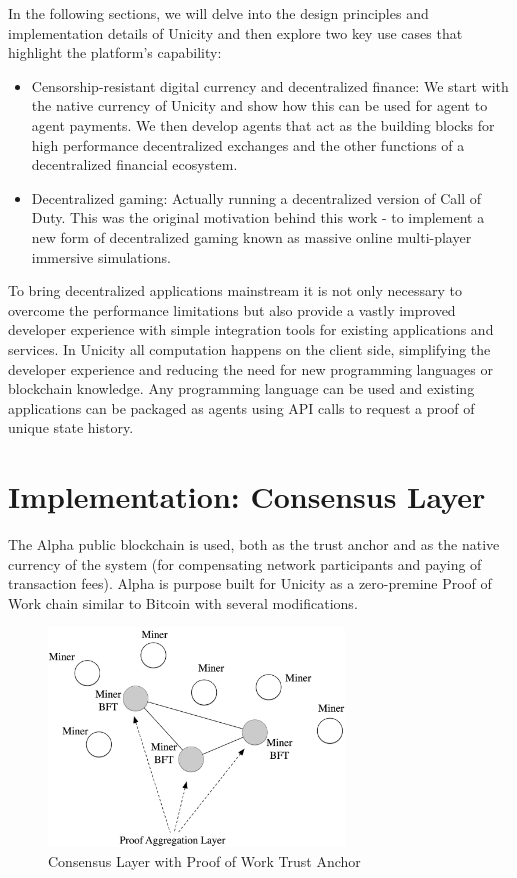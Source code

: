 \documentclass{article}
\begin{document}
\vspace{2mm}

In the following sections, we will delve into the design principles and implementation details of Unicity and then explore two key use cases that highlight the platform's capability:

\begin{itemize}
\setlength{\leftmargin}{1em}
 \item Censorship-resistant digital currency and decentralized finance:  We start with the native currency of Unicity and show how this can be used for agent to agent payments. We then develop agents that act as the building blocks for high performance decentralized exchanges and the other functions of a decentralized financial ecosystem.
 \item Decentralized gaming: Actually running a decentralized version of Call of Duty.  This was the original motivation behind this work - to implement a new form of decentralized gaming known as massive online multi-player immersive simulations.
\end{itemize}


To bring decentralized applications mainstream it is not only necessary to overcome the performance limitations but also provide a vastly improved developer experience with simple integration tools for existing applications and services. In Unicity all computation happens on the client side, simplifying the developer experience and reducing the need for new programming languages or blockchain knowledge. Any programming language can be used and existing applications can be packaged as agents  using API calls to request a proof of unique state history.


\section{Implementation: Consensus Layer}

The Alpha public blockchain is used, both as the trust anchor and as the native currency of the system (for compensating network participants and paying of transaction fees). Alpha is purpose built for Unicity as a zero-premine Proof of Work chain similar to Bitcoin with several modifications.

\begin{figure}[htbp]
    \centering
    \includegraphics[width=0.7\textwidth]{Miners.png}
    \caption{Consensus Layer with Proof of Work Trust Anchor}
    \label{fig:miners}
\end{figure}
\end{document}
